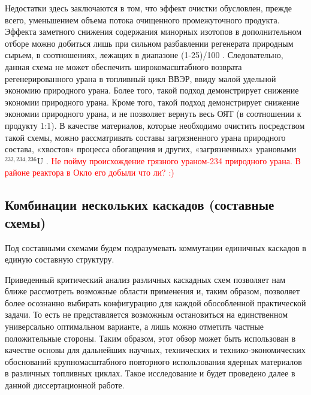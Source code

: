 Недостатки здесь заключаются в том, что эффект очистки обусловлен, прежде всего, уменьшением объема потока очищенного промежуточного продукта. Эффекта заметного снижения содержания минорных изотопов в дополнительном отборе можно добиться лишь при сильном разбавлении регенерата природным сырьем, в соотношениях, лежащих в диапазоне (1-25)/100 \cite{palkinSeparationUraniumIsotopes2010, smirnovKaskadnyeShemyZadachah2012}. Следовательно, данная схема не может обеспечить широкомасштабного возврата регенерированного урана в топливный цикл ВВЭР, ввиду малой удельной экономию природного урана.  Более того, такой подход демонстрирует снижение экономии природного урана. Кроме того, такой подход демонстрирует снижение экономии природного урана, и не позволяет вернуть весь ОЯТ (в соотношении к продукту 1:1).
В качестве материалов, которые необходимо очистить посредством такой схемы, можно рассматривать составы загрязненного урана природного состава, «хвостов» процесса обогащения и других, «загрязненных» урановыми $^{232,234,236}$U \cite{palkinSeparationUraniumIsotopes2010}. 
\textcolor{red}{Не пойму происхождение грязного ураном-234 природного урана. В районе реактора в Окло его добыли что ли? :)}

\subsection{Комбинации нескольких каскадов (составные схемы)}\label{sec:ch1/sec2.4}
Под составными схемами будем подразумевать коммутации единичных каскадов в единую составную структуру.

Приведенный критический анализ различных каскадных схем позволяет нам ближе рассмотреть возможные области применения и, таким образом, позволяет более осознанно выбирать конфигурацию для каждой обособленной практической задачи. То есть не представляется возможным остановиться на единственном универсально оптимальном варианте, а лишь можно отметить частные положительные стороны. Таким образом, этот обзор может быть использован в качестве основы для дальнейших научных, технических и технико-экономических обоснований крупномасштабного повторного использования ядерных материалов в различных топливных циклах. Такое исследование и будет проведено далее в данной диссертационной работе.

